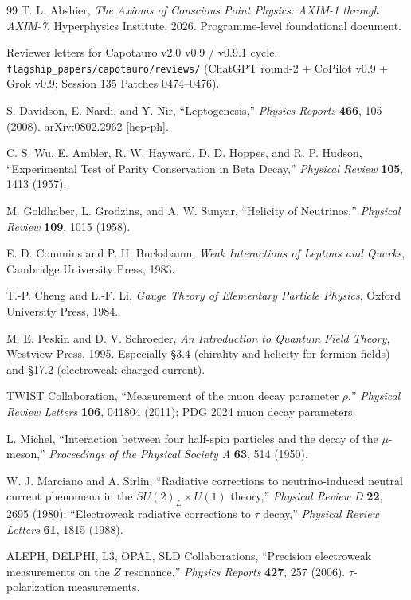 \documentclass[11pt,letterpaper]{article}
\begin{document}
\begin{thebibliography}{99}
T. L. Abshier, \emph{The Axioms of Conscious Point Physics: AXIM-1 through AXIM-7}, Hyperphysics Institute, 2026. Programme-level foundational document.

Reviewer letters for Capotauro v2.0 v0.9 / v0.9.1 cycle. \texttt{flagship\_papers/capotauro/reviews/} (ChatGPT round-2 + CoPilot v0.9 + Grok v0.9; Session 135 Patches 0474--0476).

S. Davidson, E. Nardi, and Y. Nir, ``Leptogenesis,'' \emph{Physics Reports} \textbf{466}, 105 (2008). arXiv:0802.2962 [hep-ph].

C. S. Wu, E. Ambler, R. W. Hayward, D. D. Hoppes, and R. P. Hudson, ``Experimental Test of Parity Conservation in Beta Decay,'' \emph{Physical Review} \textbf{105}, 1413 (1957).

M. Goldhaber, L. Grodzins, and A. W. Sunyar, ``Helicity of Neutrinos,'' \emph{Physical Review} \textbf{109}, 1015 (1958).

E. D. Commins and P. H. Bucksbaum, \emph{Weak Interactions of Leptons and Quarks}, Cambridge University Press, 1983.

T.-P. Cheng and L.-F. Li, \emph{Gauge Theory of Elementary Particle Physics}, Oxford University Press, 1984.

M. E. Peskin and D. V. Schroeder, \emph{An Introduction to Quantum Field Theory}, Westview Press, 1995. Especially §3.4 (chirality and helicity for fermion fields) and §17.2 (electroweak charged current).

TWIST Collaboration, ``Measurement of the muon decay parameter $\rho$,'' \emph{Physical Review Letters} \textbf{106}, 041804 (2011); PDG 2024 muon decay parameters.

L. Michel, ``Interaction between four half-spin particles and the decay of the $\mu$-meson,'' \emph{Proceedings of the Physical Society A} \textbf{63}, 514 (1950).

W. J. Marciano and A. Sirlin, ``Radiative corrections to neutrino-induced neutral current phenomena in the $SU(2)_L \times U(1)$ theory,'' \emph{Physical Review D} \textbf{22}, 2695 (1980); ``Electroweak radiative corrections to $\tau$ decay,'' \emph{Physical Review Letters} \textbf{61}, 1815 (1988).

ALEPH, DELPHI, L3, OPAL, SLD Collaborations, ``Precision electroweak measurements on the $Z$ resonance,'' \emph{Physics Reports} \textbf{427}, 257 (2006). $\tau$-polarization measurements.


\end{thebibliography}
\end{document}
